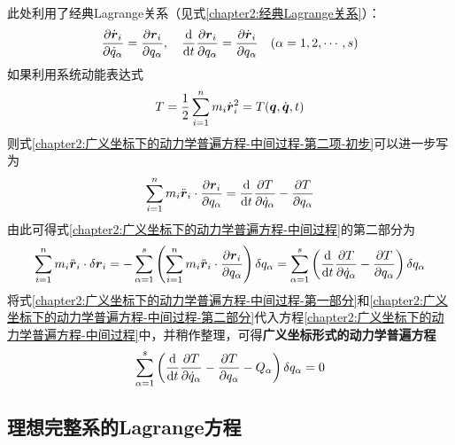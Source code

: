 此处利用了经典Lagrange关系（见式\eqref{chapter2:经典Lagrange关系}）：
\begin{equation*}
	\frac{\partial \dot{\boldsymbol{r}}_i}{\partial \dot{q}_\alpha} = \frac{\partial \boldsymbol{r}_i}{\partial q_\alpha}, \quad \frac{\mathrm{d}}{\mathrm{d} t}\frac{\partial \boldsymbol{r}_i}{\partial q_\alpha} = \frac{\partial \dot{\boldsymbol{r}}_i}{\partial q_\alpha}\quad (\alpha=1,2,\cdots,s)
\end{equation*}
如果利用系统动能表达式
\begin{equation}
	T = \frac12 \sum_{i=1}^n m_i\dot{\boldsymbol{r}}_i^2 = T(\boldsymbol{q},\dot{\boldsymbol{q}},t)
	\label{chapter2:系统动能表达式}
\end{equation}
则式\eqref{chapter2:广义坐标下的动力学普遍方程-中间过程-第二项-初步}可以进一步写为
\begin{equation}
	\sum_{i=1}^nm_i\ddot{\boldsymbol{r}}_i\cdot \frac{\partial \boldsymbol{r}_i}{\partial q_\alpha} = \frac{\mathrm{d}}{\mathrm{d} t}\frac{\partial T}{\partial \dot{q}_\alpha} - \frac{\partial T}{\partial q_\alpha}
	\label{chapter2:广义坐标下的动力学普遍方程-中间过程-第二项}
\end{equation}
由此可得式\eqref{chapter2:广义坐标下的动力学普遍方程-中间过程}的第二部分为
\begin{equation}
	\sum_{i=1}^n m_i\ddot{\boldsymbol{r}}_i\cdot\delta \boldsymbol{r}_i = -\sum_{\alpha=1}^s\left(\sum_{i=1}^n m_i\ddot{\boldsymbol{r}}_i\cdot \frac{\partial \boldsymbol{r}_i}{\partial q_\alpha}\right) \delta q_\alpha = \sum_{\alpha=1}^s\left(\frac{\mathrm{d}}{\mathrm{d} t}\frac{\partial T}{\partial \dot{q}_\alpha} - \frac{\partial T}{\partial q_\alpha}\right)\delta q_\alpha
	\label{chapter2:广义坐标下的动力学普遍方程-中间过程-第二部分}
\end{equation}
将式\eqref{chapter2:广义坐标下的动力学普遍方程-中间过程-第一部分}和\eqref{chapter2:广义坐标下的动力学普遍方程-中间过程-第二部分}代入方程\eqref{chapter2:广义坐标下的动力学普遍方程-中间过程}中，并稍作整理，可得{\bf 广义坐标形式的动力学普遍方程}
\begin{equation}
	\sum_{\alpha=1}^s \left(\frac{\mathrm{d}}{\mathrm{d} t}\frac{\partial T}{\partial \dot{q}_\alpha} - \frac{\partial T}{\partial q_\alpha}-Q_\alpha\right)\delta q_\alpha = 0
	\label{chapter2:广义坐标形式的动力学普遍方程}
\end{equation}

\subsection{理想完整系的Lagrange方程}\label{chapter2:subsection-理想完整系的Lagrange方程}

